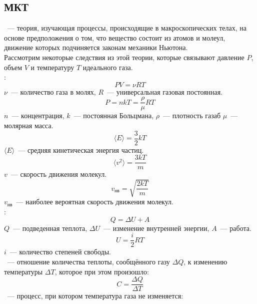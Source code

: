 \subsection{МКТ}
~--- теория, изучающая процессы, происходящие в макроскопических телах, на основе предположения о том, что вещество состоит из атомов и молеул, движение которых подчиняется законам механики Ньютона.\\
Рассмотрим некоторые следствия из этой теории, которые связывают давление $P$, объем $V$ и температуру $T$ идеального газа.\\
:
\begin{equation}
PV = \nu R T 
\end{equation}
$\nu$~--- количество газа в молях, $R$~--- универсальная газовая постоянная.
\begin{equation}
P = nkT =  \frac{\rho}{\mu}RT
\end{equation}
$n$~--- концентрация, $k$~--- постоянная Больцмана, $\rho$~--- плотность газаб $\mu$~--- молярная масса.
\begin{equation}
\langle E \rangle = \frac{3}{2}kT
\end{equation}
$\langle E \rangle$~--- средняя кинетическая энергия частиц.
\begin{equation}
\langle v^2 \rangle = \frac{3kT}{m}
\end{equation}
$v$~--- скорость движения молекул.
\begin{equation}
v_\text{нв} = \sqrt{\frac{2kT}{m}}
\end{equation}
$v_\text{нв}$~--- наиболее вероятная скорость движения молекул.\\
:
\begin{equation}
Q = \Delta U + A
\end{equation}
$Q$~--- подведенная теплота, $\Delta U$~--- изменение внутренней энергии, $A$~--- работа.\\
\begin{equation}
U = \frac{i}{2}RT
\end{equation}
$i$~--- количество степеней свободы.\\
~--- отношение количества теплоты, сообщённого газу $\Delta Q$, к изменению температуры $\Delta T$, которое при этом произошло:
\begin{equation}
C = \frac{\Delta Q}{\Delta T}
\end{equation} 
~--- процесс, при котором температура газа не изменяется:

